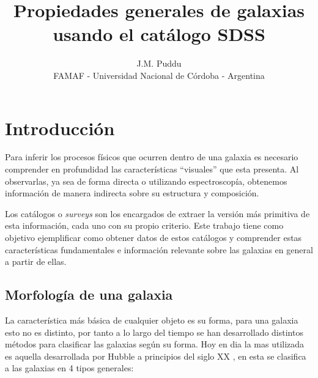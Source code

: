 \documentclass{article}
\title{Propiedades generales de galaxias usando el catálogo SDSS}
\author{J.M. Puddu \\ FAMAF - Universidad Nacional de Córdoba - Argentina}
\begin{document}

\section{Introducción}

Para inferir los procesos físicos que ocurren dentro de una galaxia es necesario comprender en profundidad las características ``visuales'' que esta presenta. Al observarlas, ya sea de forma directa o utilizando espectroscopía, obtenemos información de manera indirecta sobre su estructura y composición.

Los catálogos o \textit{surveys} son los encargados de extraer la versión más primitiva de esta información, cada uno con su propio criterio. Este trabajo tiene como objetivo ejemplificar como obtener datos de estos catálogos y comprender estas características fundamentales e información relevante sobre las galaxias en general a partir de ellas.


\subsection{Morfología de una galaxia}
La característica más básica de cualquier objeto es su forma, para una galaxia esto no es distinto, por tanto a lo largo del tiempo se han desarrollado distintos métodos para clasificar las galaxias según su forma.
Hoy en dia la mas utilizada es  aquella desarrollada por Hubble a principios del siglo XX \citep{1926ApJ....64..321H}, en esta se clasifica a las galaxias en 4 tipos generales: 
\end{document}
